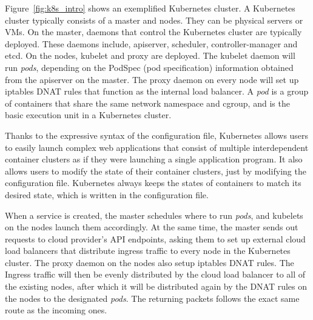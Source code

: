 Figure~\ref{fig:k8s_intro} shows an exemplified Kubernetes cluster.
A Kubernetes cluster typically consists of a master and nodes. They can be physical servers or VMs.
On the master, daemons that control the Kubernetes cluster are typically deployed. 
These daemons include, apiserver, scheduler, controller-manager and etcd. 
On the nodes, kubelet and proxy are deployed.
The kubelet daemon will run {\it pods}, depending on the PodSpec (pod specification) information obtained from the apiserver on the master.
The proxy daemon on every node will set up iptables DNAT rules that function as the internal load balancer.
A {\em pod} is a group of containers that share the same network namespace and cgroup,
and is the basic execution unit in a Kubernetes cluster.

Thanks to the expressive syntax of the configuration file, Kubernetes allows users to easily launch complex web applications that consist of multiple interdependent container clusters as if they were launching a single application program.
It also allows users to modify the state of their container clusters, just by modifying the configuration file.
Kubernetes always keeps the states of containers to match its desired state, which is written in the configuration file.

When a service is created, the master schedules where to run {\em pods}, and kubelets on the nodes launch them accordingly.
At the same time, the master sends out requests to cloud provider's API endpoints, asking them to set up external cloud load balancers that distribute ingress traffic to every node in the Kubernetes cluster.
The proxy daemon on the nodes also setup iptables DNAT\cite{MartinA.Brown2017} rules. 
The Ingress traffic will then be evenly distributed by the cloud load balancer to all of the existing nodes, 
after which it will be distributed again by the DNAT rules on the nodes to the designated {\em pods}. 
The returning packets follows the exact same route as the incoming ones.


